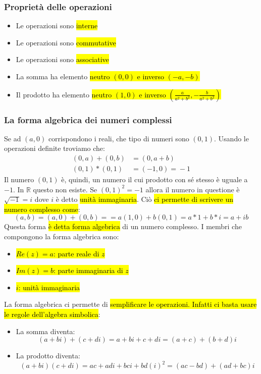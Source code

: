 \subsubsection{Proprietà delle operazioni}
\begin{itemize}
    \item Le operazioni sono \hl{interne}
    \item Le operazioni sono \hl{commutative}
    \item Le operazioni sono \hl{associative}
    \item La somma ha elemento \hl{neutro $(0,0)$ e inverso $(-a,-b)$}
    \item Il prodotto ha elemento \hl{neutro $(1,0)$ e inverso 
        $(\frac{a}{a^2 + b^2}, -\frac{b}{a^2 + b^2})$}
\end{itemize}

\subsubsection{La forma algebrica dei numeri complessi}
Se ad $(a, 0)$ corrispondono i reali, che tipo di numeri sono $(0,1)$. Usando le
operazioni definite troviamo che:
\begin{align*}
    (0,a) + (0,b) &= (0,a+b) \\
    (0,1) * (0,1) &= (-1,0) \mathit{=} -1
\end{align*}
Il numero $(0,1)$ è, quindi, un numero il cui prodotto con sé stesso è uguale a 
$-1$. In $\mathbb{R}$ questo non esiste. Se $(0,1)^2 = -1$ allora il numero in questione
è $\sqrt{-1} = i$ dove $i$ è detto \hl{unità immaginaria}. Ciò \hl{ci permette di 
scrivere un numero complesso come}:
\[
    (a,b) = (a,0) + (0,b) = = a(1,0) + b(0,1) = a * 1 + b * i = a + ib
\]
Questa forma \hl{è detta forma algebrica} di un numero complesso. I membri che
compongono la forma algebrica sono:
\begin{itemize}
    \item \hl{$Re(z) = a$: parte reale di $z$}
    \item \hl{$Im(z) = b$: parte immaginaria di $z$}
    \item \hl{$i$: unità immaginaria}
\end{itemize}

La forma algebrica ci permette di \hl{semplificare le operazioni. Infatti ci basta
usare le regole dell'algebra simbolica}:
\begin{itemize}
    \item La somma diventa: 
        \[ (a+bi) + (c+di) = a + bi + c + di = (a+c) + (b + d)i \]
    \item La prodotto diventa: 
        \[ (a+bi)(c+di) = ac + adi + bci + bd(i)^2 = (ac - bd) + (ad + bc)i \]
\end{itemize}

